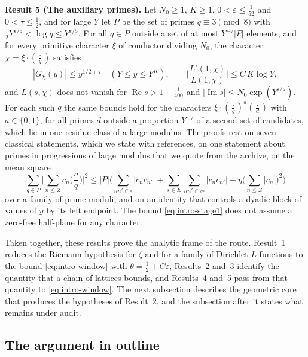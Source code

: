 \documentclass[11pt,letterpaper]{article}
\numberwithin{equation}{section}
\begin{document}
\medskip
\noindent\textbf{Result 5 (The auxiliary primes).}
Let $N_0\ge1$, $K\ge1$, $0<\varepsilon\le\tfrac1{52}$ and $0<\tau\le\tfrac12$, and for large $Y$ let $P$ be the set of primes $q\equiv3\pmod8$ with $\tfrac12Y^{\varepsilon/5}<\log q\le Y^{\varepsilon/5}$. For all $q\in P$ outside a set of at most $Y^{-\tau}|P|$ elements, and for every primitive character $\xi$ of conductor dividing $N_0$, the character $\chi=\xi\cdot(\tfrac{\cdot}{q})$ satisfies
\begin{equation}\label{eq:intro-stage1}
|G_\chi(y)|\le y^{1/2+\tau}\quad(Y\le y\le Y^K),\qquad\Big|\frac{L'(1,\chi)}{L(1,\chi)}\Big|\le C\,K\log Y,
\end{equation}
and $L(s,\chi)$ does not vanish for $\operatorname{Re}s>1-\tfrac1{400}$ and $|\operatorname{Im}s|\le N_0\exp(Y^{\varepsilon/5})$. For each such $q$ the same bounds hold for the characters $\xi\cdot(\tfrac{\cdot}{q})^a(\tfrac{\cdot}{d})$ with $a\in\{0,1\}$, for all primes $d$ outside a proportion $Y^{-\tau}$ of a second set of candidates, which lie in one residue class of a large modulus. The proofs rest on seven classical statements, which we state with references, on one statement about primes in progressions of large modulus that we quote from the archive, on the mean square
\begin{equation}\label{eq:intro-meansq}
\sum_{q\in P}\Big|\sum_{n\le Z}c_n\Big(\frac nq\Big)\Big|^2\le|P|\Big(\sum_{nn'\in\square}|c_nc_{n'}|+\sum_{s\in E}\sum_{nn'\in s\square}|c_nc_{n'}|+\eta\Big(\sum_{n\le Z}|c_n|\Big)^2\Big)
\end{equation}
over a family of prime moduli, and on an identity that controls a dyadic block of values of $y$ by its left endpoint. The bound \eqref{eq:intro-stage1} does not assume a zero-free half-plane for any character.

Taken together, these results prove the analytic frame of the route. Result~1 reduces the Riemann hypothesis for $\zeta$ and for a family of Dirichlet $L$-functions to the bound \eqref{eq:intro-window} with $\theta=\tfrac12+C\varepsilon$, Results~2 and~3 identify the quantity that a chain of lattices bounds, and Results~4 and~5 pass from that quantity to \eqref{eq:intro-window}. The next subsection describes the geometric core that produces the hypotheses of Result~2, and the subsection after it states what remains under audit.

\subsection{The argument in outline}\label{sec:outline}
\end{document}
